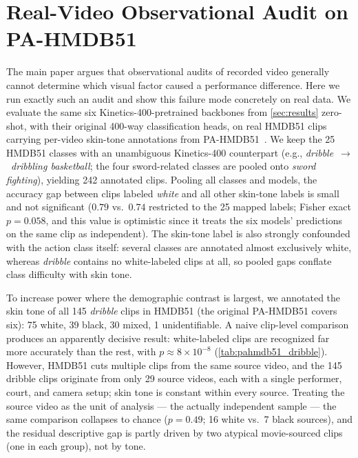 
\section{Real-Video Observational Audit on PA-HMDB51}
\label{sec:supp_pahmdb51}

The main paper argues that observational audits of recorded video generally
cannot determine which visual factor caused a performance difference. Here we
run exactly such an audit and show this failure mode concretely on real data.
We evaluate the same six Kinetics-400-pretrained backbones from
\cref{sec:results} zero-shot, with their original 400-way classification
heads, on real HMDB51 clips carrying per-video skin-tone annotations from
PA-HMDB51~\cite{pahmdb51}. We keep the 25 HMDB51 classes with an unambiguous
Kinetics-400 counterpart (e.g., \textit{dribble}~$\rightarrow$~\textit{dribbling
basketball}; the four sword-related classes are pooled onto \textit{sword
fighting}), yielding 242 annotated clips. Pooling all classes and models, the
accuracy gap between clips labeled \textit{white} and all other skin-tone
labels is small and not significant ($0.79$ vs.\ $0.74$ restricted to the 25
mapped labels; Fisher exact $p=0.058$, and this value is optimistic since it
treats the six models' predictions on the same clip as independent). The
skin-tone label is also strongly confounded with the action class itself:
several classes are annotated almost exclusively white, whereas
\textit{dribble} contains no white-labeled clips at all, so pooled gaps
conflate class difficulty with skin tone.

To increase power where the demographic contrast is largest, we annotated the
skin tone of all 145 \textit{dribble} clips in HMDB51 (the original PA-HMDB51
covers six): 75 white, 39 black, 30 mixed, 1 unidentifiable. A naive
clip-level comparison produces an apparently decisive result: white-labeled
clips are recognized far more accurately than the rest, with
$p\approx8\times10^{-8}$ (\cref{tab:pahmdb51_dribble}). However, HMDB51 cuts
multiple clips from the same source video, and the 145 dribble clips originate
from only 29 source videos, each with a single performer, court, and camera
setup; skin tone is constant within every source. Treating the source video as
the unit of analysis --- the actually independent sample --- the same
comparison collapses to chance ($p=0.49$; 16 white vs.\ 7 black sources), and
the residual descriptive gap is partly driven by two atypical movie-sourced
clips (one in each group), not by tone.

